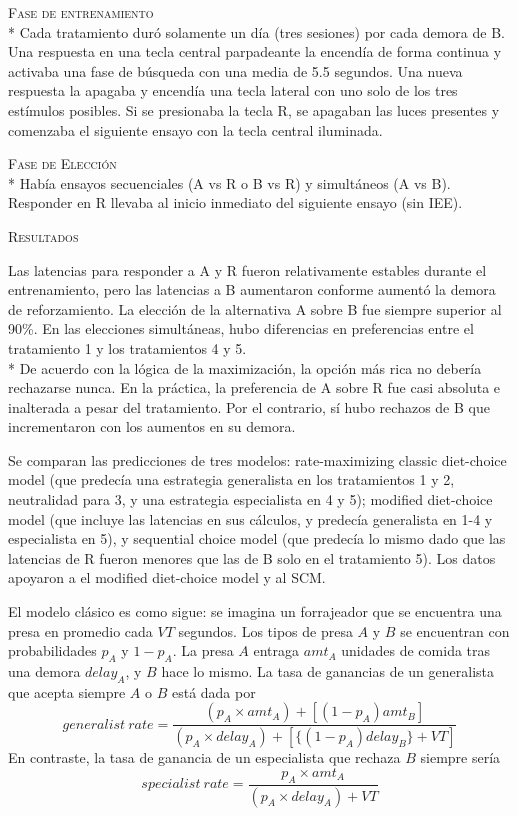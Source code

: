 \documentclass[a4paper,12pt]{article}
\begin{document}
{\scshape Fase de entrenamiento}\\*
Cada tratamiento duró solamente un día (tres sesiones) por cada demora de B. Una respuesta en una tecla central parpadeante la encendía de forma continua y activaba una fase de búsqueda con una media de 5.5 segundos. Una nueva respuesta la apagaba y encendía una tecla lateral con uno solo de los tres estímulos posibles. Si se presionaba la tecla R, se apagaban las luces presentes y comenzaba el siguiente ensayo con la tecla central iluminada.

{\scshape Fase de Elección}\\*
Había ensayos secuenciales (A vs R o B vs R) y simultáneos (A vs B). Responder en R llevaba al inicio inmediato del siguiente ensayo (sin IEE).

{\scshape Resultados}

Las latencias para responder a A y R fueron relativamente estables durante el entrenamiento, pero las latencias a B aumentaron conforme aumentó la demora de reforzamiento. La elección de la alternativa A sobre B fue siempre superior al 90\%. En las elecciones simultáneas, hubo diferencias en preferencias entre el tratamiento 1 y los tratamientos 4 y 5.\\*
De acuerdo con la lógica de la maximización, la opción más rica no debería rechazarse nunca. En la práctica, la preferencia de A sobre R fue casi absoluta e inalterada a pesar del tratamiento. Por el contrario, sí hubo rechazos de B que incrementaron con los aumentos en su demora.

Se comparan las predicciones de tres modelos: rate-maximizing classic diet-choice model (que predecía una estrategia generalista en los tratamientos 1 y 2, neutralidad para 3, y una estrategia especialista en 4 y 5); modified diet-choice model (que incluye las latencias en sus cálculos, y predecía generalista en 1-4 y especialista en 5), y sequential choice model (que predecía lo mismo dado que las latencias de R fueron menores que las de B solo en el tratamiento 5). Los datos apoyaron a el modified diet-choice model y al SCM.

El modelo clásico es como sigue: se imagina un forrajeador que se encuentra una presa en promedio cada $VT$ segundos. Los tipos de presa $A$ y $B$ se encuentran con probabilidades $p_A$ y $1-p_A$. La presa $A$ entraga $amt_A$ unidades de comida tras una demora $delay_A$, y $B$ hace lo mismo. La tasa de ganancias de un generalista que acepta siempre $A$ o $B$ está dada por
$$generalist\ rate=\frac{(p_A\times amt_A)+[(1-p_A)amt_B]}{(p_A\times delay_A)+[\{(1-p_A)delay_B\}+VT]}$$
En contraste, la tasa de ganancia de un especialista que rechaza $B$ siempre sería 
$$specialist\ rate=\frac{p_A\times amt_A}{(p_A\times delay_A)+VT}$$
\end{document}
